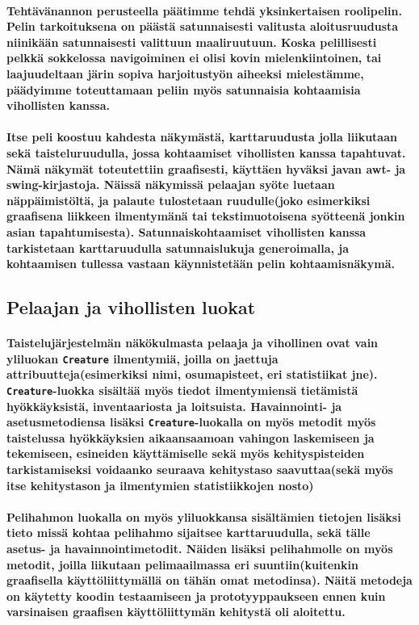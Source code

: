 \documentclass[10pt,a4paper,draft]{article}
\begin{document}
\paragraph{Tehtävänannon perusteella päätimme tehdä yksinkertaisen roolipelin. Pelin tarkoituksena on päästä satunnaisesti valitusta aloitusruudusta niinikään satunnaisesti valittuun maaliruutuun. Koska pelillisesti pelkkä sokkelossa navigoiminen ei olisi kovin mielenkiintoinen, tai laajuudeltaan järin sopiva harjoitustyön aiheeksi mielestämme, päädyimme toteuttamaan peliin myös satunnaisia kohtaamisia vihollisten kanssa.}
\paragraph{Itse peli koostuu kahdesta näkymästä, karttaruudusta jolla liikutaan sekä taisteluruudulla, jossa kohtaamiset vihollisten kanssa tapahtuvat. Nämä näkymät toteutettiin graafisesti, käyttäen hyväksi javan awt- ja swing-kirjastoja. Näissä näkymissä pelaajan syöte luetaan näppäimistöltä, ja palaute tulostetaan ruudulle(joko esimerkiksi graafisena liikkeen ilmentymänä tai tekstimuotoisena syötteenä jonkin asian tapahtumisesta). Satunnaiskohtaamiset vihollisten kanssa tarkistetaan karttaruudulla satunnaislukuja generoimalla, ja kohtaamisen tullessa vastaan käynnistetään pelin kohtaamisnäkymä.}

\subsection{Pelaajan ja vihollisten luokat}
\paragraph{Taistelujärjestelmän näkökulmasta pelaaja ja vihollinen ovat vain yliluokan \texttt{Creature} ilmentymiä, joilla on jaettuja attribuutteja(esimerkiksi nimi, osumapisteet, eri statistiikat jne). \texttt{Creature}-luokka sisältää myös tiedot ilmentymiensä tietämistä hyök\-käy\-ksi\-stä, inventaariosta ja loitsuista. Havainnointi- ja asetusmetodiensa lisäksi \texttt{Creature}-luokalla on myös metodit myös taistelussa hyökkäyksien aikaansaamoan vahingon laskemiseen ja tekemiseen, esineiden käyttämiselle sekä myös kehityspisteiden tarkistamiseksi voidaanko seuraava kehitystaso saavuttaa(sekä myös itse kehitystason ja ilmentymien statistiikkojen nosto) }
\paragraph{Pelihahmon luokalla on myös yliluokkansa sisältämien tietojen lisäksi tieto missä kohtaa pelihahmo sijaitsee karttaruudulla, sekä tälle asetus- ja havainnointimetodit. Näiden lisäksi pelihahmolle on myös metodit, joilla liikutaan pelimaailmassa eri suuntiin(kuitenkin graafisella käyttöliittymällä on tähän omat metodinsa). Näitä metodeja on käytetty koodin testaamiseen ja prototyyppaukseen ennen kuin varsinaisen graafisen käyttöliittymän kehitystä oli aloitettu.}
\end{document}
